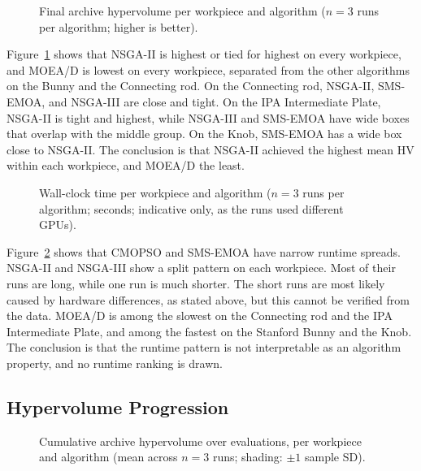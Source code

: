 \begin{figure}[H]
    \centering
    \caption{Final archive hypervolume per workpiece and algorithm ($n=3$ runs per algorithm;
    higher is better).}
    \label{fig:tf_summary_hv}
\end{figure}

Figure~\ref{fig:tf_summary_hv} shows that NSGA-II is highest or tied for highest on every
workpiece, and MOEA/D is lowest on every workpiece, separated from the other algorithms on the
Bunny and the Connecting rod. On the Connecting rod, NSGA-II, SMS-EMOA, and NSGA-III are close
and tight. On the IPA Intermediate Plate, NSGA-II is tight and highest, while NSGA-III and SMS-EMOA
have wide boxes that overlap with the middle group. On the Knob, SMS-EMOA has a wide box close to
NSGA-II. The conclusion is that NSGA-II achieved the highest mean HV within each workpiece, and MOEA/D the least.

\begin{figure}[H]
    \centering
    \caption{Wall-clock time per workpiece and algorithm ($n=3$ runs per algorithm; seconds;
    indicative only, as the runs used different GPUs).}
    \label{fig:tf_summary_runtime}
\end{figure}

Figure~\ref{fig:tf_summary_runtime} shows that CMOPSO and SMS-EMOA have narrow runtime spreads.
NSGA-II and NSGA-III show a split pattern on each workpiece. Most of their runs are long, while
one run is much shorter. The short runs are most likely caused by hardware differences, as stated
above, but this cannot be verified from the data. MOEA/D is among the slowest on the Connecting
rod and the IPA Intermediate Plate, and among the fastest on the Stanford Bunny and the Knob. The
conclusion is that the runtime pattern is not interpretable as an algorithm property, and no
runtime ranking is drawn.

\subsection{Hypervolume Progression}
\label{subsec:results_tf_progression}

\begin{figure}[H]
    \centering
    \caption{Cumulative archive hypervolume over evaluations, per workpiece and algorithm
    (mean across $n=3$ runs; shading: $\pm 1$ sample SD).}
    \label{fig:tf_hv_progression}
\end{figure}

